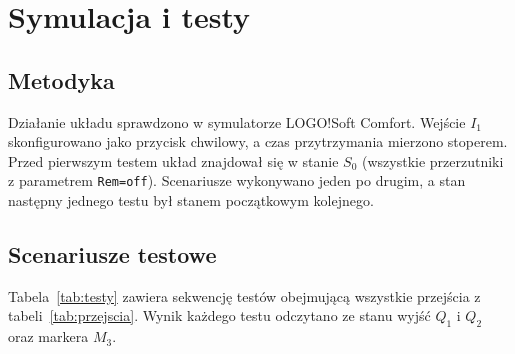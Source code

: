 \section{Symulacja i testy}
\label{sec:testy}

\subsection{Metodyka}
Działanie układu sprawdzono w symulatorze LOGO!Soft Comfort. Wejście
$I_1$ skonfigurowano jako przycisk chwilowy, a czas przytrzymania
mierzono stoperem. Przed pierwszym testem układ znajdował się w stanie
$S_0$ (wszystkie przerzutniki z parametrem \texttt{Rem=off}).
Scenariusze wykonywano jeden po drugim, a stan następny jednego testu
był stanem początkowym kolejnego.

\subsection{Scenariusze testowe}
Tabela~\ref{tab:testy} zawiera sekwencję testów obejmującą wszystkie
przejścia z tabeli~\ref{tab:przejscia}. Wynik każdego testu odczytano
ze stanu wyjść $Q_1$ i $Q_2$ oraz markera $M_3$.

